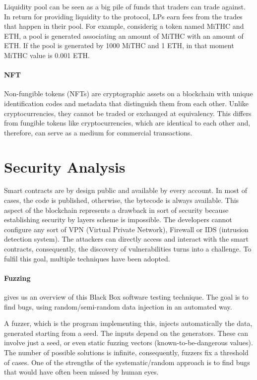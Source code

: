 Liquidity pool can be seen as a big pile of funds that traders can trade against. 
In return for providing liquidity to the protocol, LPs earn fees from the trades that happen in their pool.
For example, considerig a token named MiTHC and ETH, a pool is generated associating an amount of MiTHC with an amount of ETH. 
If the pool is generated by 1000 MiTHC and 1 ETH, in that moment MiTHC value is 0.001 ETH.

\paragraph{NFT} Non-fungible tokens (NFTs) are cryptographic assets on a blockchain with unique identification codes and metadata that distinguish them from each other.
Unlike cryptocurrencies, they cannot be traded or exchanged at equivalency. 
This differs from fungible tokens like cryptocurrencies, which are identical to each other and, therefore, can serve as a medium for commercial transactions. 



\section{Security Analysis}
\label{sec:Backgroud:SecurityAnalysis}
Smart contracts are by design public and available by every account. 
In most of cases, the code is published, otherwise, the bytecode is always available.
This aspect of the blockchain represents a drawback in sort of security because establishing security by layers scheme is impossible.
The developers cannot configure any sort of VPN (Virtual Private Network), Firewall or IDS (intrusion detection system). 
The attackers can directly access and interact with the smart contracts, consequently, the discovery of vulnerabilities turns into a challenge.
To fulfil this goal, multiple techniques have been adopted.


\paragraph{Fuzzing} \citet{OWASPFuzz} gives us an overview of this Black Box software testing technique. 
The goal is to find bugs, using random/semi-random data injection in an automated way. 

A fuzzer, which is the program implementing this, injects automatically the data, generated starting from a seed. The inputs depend on the generators. 
These can involve just a seed, or even static fuzzing vectors (known-to-be-dangerous values).
The number of possible solutions is infinite, consequently, fuzzers fix a threshold of cases.
One of the strengths of the systematic/random approach is to find bugs that would have often been missed by human eyes.


